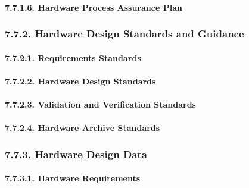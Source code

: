 \documentclass[
]{article}
\begin{document}
\hypertarget{hardware-process-assurance-plan-1}{%
\paragraph{7.7.1.6. Hardware Process Assurance
Plan}\label{hardware-process-assurance-plan-1}}

\hypertarget{hardware-design-standards-and-guidance-1}{%
\subsubsection{7.7.2. Hardware Design Standards and
Guidance}\label{hardware-design-standards-and-guidance-1}}

\hypertarget{requirements-standards-1}{%
\paragraph{7.7.2.1. Requirements
Standards}\label{requirements-standards-1}}

\hypertarget{hardware-design-standards-1}{%
\paragraph{7.7.2.2. Hardware Design
Standards}\label{hardware-design-standards-1}}

\hypertarget{validation-and-verification-standards-1}{%
\paragraph{7.7.2.3. Validation and Verification
Standards}\label{validation-and-verification-standards-1}}

\hypertarget{hardware-archive-standards-1}{%
\paragraph{7.7.2.4. Hardware Archive
Standards}\label{hardware-archive-standards-1}}

\hypertarget{hardware-design-data-1}{%
\subsubsection{7.7.3. Hardware Design
Data}\label{hardware-design-data-1}}

\hypertarget{hardware-requirements-1}{%
\paragraph{7.7.3.1. Hardware
Requirements}\label{hardware-requirements-1}}
\end{document}
